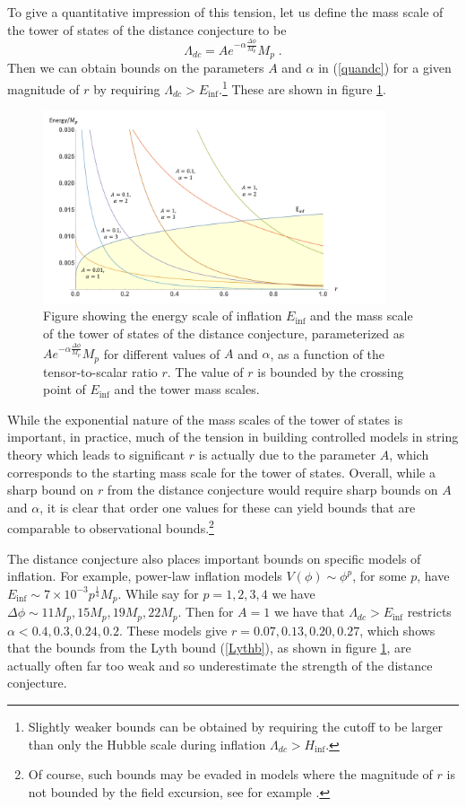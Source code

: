 \documentclass[11pt,a4paper]{article}
\numberwithin{equation}{section}
\numberwithin{table}{section}\setlength{\multlinegap}{25pt}
\newcommand{\be}{\begin{equation}}
\newcommand{\ee}{\end{equation}}
\begin{document}
To give a quantitative impression of this tension, let us define the mass scale of the tower of states of the distance conjecture to be
\be
\Lambda_{dc} = A e^{-\alpha \frac{\Delta \phi}{M_p}} M_p \;.
\label{quandc}
\ee
Then we can obtain bounds on the parameters $A$ and $\alpha$ in (\ref{quandc}) for a given magnitude of $r$ by requiring $\Lambda_{dc} > E_{\mathrm{inf}}$.\footnote{Slightly weaker bounds can be obtained by requiring the cutoff to be larger than only the Hubble scale during inflation $\Lambda_{dc} > H_{\mathrm{inf}}$.} These are shown in figure \ref{fig:bndr}. 
\begin{figure}[t]
\centering
 \includegraphics[width=0.9\textwidth]{rbounds.pdf}
\caption{Figure showing the energy scale of inflation $E_{\mathrm{inf}}$ and the mass scale of the tower of states of the distance conjecture, parameterized as $A e^{-\alpha \frac{\Delta \phi}{M_p}} M_p$ for different values of $A$ and $\alpha$, as a function of the tensor-to-scalar ratio $r$. The value of $r$ is bounded by the crossing point of $E_{\mathrm{inf}}$ and the tower mass scales.}
\label{fig:bndr}
\end{figure}
While the exponential nature of the mass scales of the tower of states is important, in practice, much of the tension in building controlled models in string theory which leads to significant $r$ is actually due to the parameter $A$, which corresponds to the starting mass scale for the tower of states. Overall, while a sharp bound on $r$ from the distance conjecture would require sharp bounds on $A$ and $\alpha$, it is clear that order one values for these can yield bounds that are comparable to observational bounds.\footnote{Of course, such bounds may be evaded in models where the magnitude of $r$ is not bounded by the field excursion, see for example \cite{BenDayan:2009kv,Wolfson:2016vyx}.} 

The distance conjecture also places important bounds on specific models of inflation. For example, power-law inflation models $V\left(\phi\right) \sim \phi^p$, for some $p$, have $E_{\mathrm{inf}}\sim 7 \times 10^{-3} p^{\frac14} M_p$. While say for $p=1,2,3,4$ we have $\Delta \phi \sim 11M_p, 15M_p, 19M_p, 22M_p$. Then for $A=1$ we have that $\Lambda_{dc} > E_{\mathrm{inf}}$ restricts $\alpha < 0.4,0.3,0.24,0.2$. These models give $r=0.07,0.13,0.20,0.27$, which shows that the bounds from the Lyth bound (\ref{Lythb}), as shown in figure \ref{fig:bndr}, are actually often far too weak and so underestimate the strength of the distance conjecture. 
\end{document}
